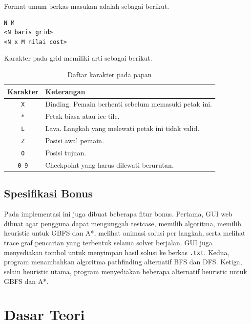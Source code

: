 Format umum berkas masukan adalah sebagai berikut.
\begin{tcolorbox}[colback=white, colframe=black, sharp corners, boxrule=0.5pt]
\begin{verbatim}
N M
<N baris grid>
<N x M nilai cost>
\end{verbatim}
\end{tcolorbox}

Karakter pada grid memiliki arti sebagai berikut.
\begin{table}[H]
    \centering
    \begin{tabular}{|c|L{9cm}|}
        \hline
        \textbf{Karakter} & \textbf{Keterangan} \\
        \hline
        \texttt{X} & Dinding. Pemain berhenti sebelum memasuki petak ini. \\
        \hline
        \texttt{*} & Petak biasa atau ice tile. \\
        \hline
        \texttt{L} & Lava. Langkah yang melewati petak ini tidak valid. \\
        \hline
        \texttt{Z} & Posisi awal pemain. \\
        \hline
        \texttt{O} & Posisi tujuan. \\
        \hline
        \texttt{0}--\texttt{9} & Checkpoint yang harus dilewati berurutan. \\
        \hline
    \end{tabular}
    \caption{Daftar karakter pada papan}
\end{table}

\subsection{Spesifikasi Bonus}\label{sub:Spesifikasi Bonus}

Pada implementasi ini juga dibuat beberapa fitur bonus. Pertama, GUI
web dibuat agar pengguna dapat mengunggah testcase, memilih algoritma,
memilih heuristic untuk GBFS dan A*, melihat animasi solusi per
langkah, serta melihat trace graf pencarian yang terbentuk selama
solver berjalan. GUI juga menyediakan tombol untuk menyimpan hasil
solusi ke berkas \texttt{.txt}. Kedua, program menambahkan algoritma pathfinding
alternatif BFS dan DFS. Ketiga, selain heuristic utama, program
menyediakan beberapa alternatif heuristic untuk GBFS dan A*.

\section{Dasar Teori}\label{sec:Dasar Teori}

